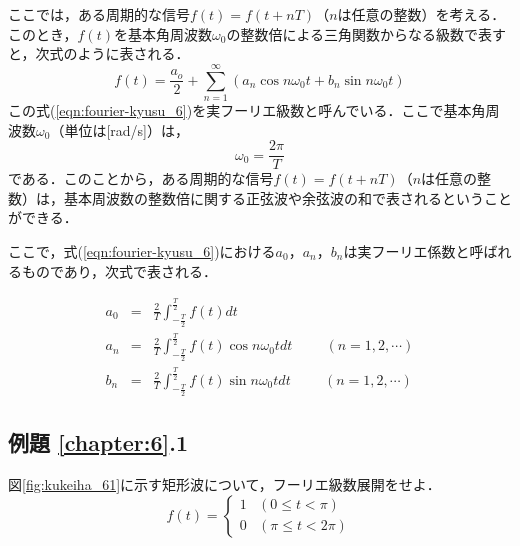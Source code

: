 ここでは，ある周期的な信号$f(t)=f(t+nT)$（$n$は任意の整数）を考える．このとき，$f(t)$を基本角周波数$\omega_0$の整数倍による三角関数からなる級数で表すと，次式のように表される．
\begin{equation}
f(t)=\frac{a_o}{2}+\sum_{n=1}^{\infty}(a_n \cos n\omega_0 t + b_n \sin n\omega_0 t)
\label{eqn:fourier-kyusu_6}
\end{equation}
この式(\ref{eqn:fourier-kyusu_6})を実フーリエ級数と呼んでいる．ここで基本角周波数$\omega_0$（単位は[rad/s]）は，
\begin{equation}
\omega_0=\frac{2\pi}{T}
\label{eqn:fourier-omega_0}
\end{equation}
である．このことから，ある周期的な信号$f(t)=f(t+nT)$（$n$は任意の整数）は，基本周波数の整数倍に関する正弦波や余弦波の和で表されるということができる．

ここで，式(\ref{eqn:fourier-kyusu_6})における$a_0$，$a_n$，$b_n$は実フーリエ係数\footnotemark と呼ばれるものであり，次式で表される．

\begin{eqnarray}
a_0&=&\frac{2}{T}\int^{\frac{T}{2}}_{-\frac{T}{2}}f(t)dt \label{eqn:fourier_a_06}\\
a_n&=&\frac{2}{T}\int^{\frac{T}{2}}_{-\frac{T}{2}}f(t) \cos n\omega_0 t dt \hspace{1cm} (n=1,2,\cdots) \label{eqn:fourier_a_n} \\
b_n&=&\frac{2}{T}\int^{\frac{T}{2}}_{-\frac{T}{2}}f(t) \sin n\omega_0 t dt \hspace{1cm} (n=1,2,\cdots)
\end{eqnarray}

\subsection*{例題 \ref{chapter:6}.1}

図\ref{fig:kukeiha_61}に示す矩形波について，フーリエ級数展開をせよ．
\begin{equation}
f(t)= \left \{
\begin{array}{ll}
1 & (0 \leq t < \pi) \\
0 & (\pi \leq t < 2\pi)
\end{array}
\right .
\end{equation}



